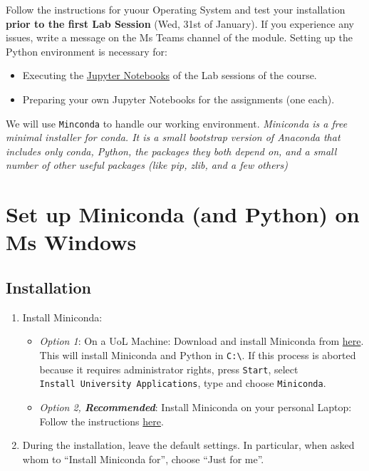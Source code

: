 \documentclass[
  letterpaper,
  DIV=11,
  numbers=noendperiod]{scrreprt}
\providecommand{\tightlist}{%
  \setlength{\itemsep}{0pt}\setlength{\parskip}{0pt}}\usepackage{longtable,booktabs,array}
\begin{document}

Follow the instructions for yuour Operating System and test your
installation \textbf{prior to the first Lab Session} (Wed, 31st of
January). If you experience any issues, write a message on the Ms Teams
channel of the module. Setting up the Python environment is necessary
for:

\begin{itemize}
\tightlist
\item
  Executing the \href{https://docs.jupyter.org/en/latest/}{Jupyter
  Notebooks} of the Lab sessions of the course.
\item
  Preparing your own Jupyter Notebooks for the assignments (one each).
\end{itemize}

We will use \texttt{Minconda} to handle our working environment.
\emph{Miniconda is a free minimal installer for conda. It is a small
bootstrap version of Anaconda that includes only conda, Python, the
packages they both depend on, and a small number of other useful
packages (like pip, zlib, and a few others)}

\section*{Set up Miniconda (and Python) on Ms
Windows}\label{set-up-miniconda-and-python-on-ms-windows}


\subsection*{Installation}\label{installation}

\begin{enumerate}
\def\labelenumi{\arabic{enumi}.}
\tightlist
\item
  Install Miniconda:

  \begin{itemize}
  \tightlist
  \item
    \emph{Option 1}: On a UoL Machine: Download and install Miniconda
    from
    \href{https://repo.anaconda.com/miniconda/Miniconda3-latest-Windows-x86_64.exe}{here}.
    This will install Miniconda and Python in
    \texttt{C:\textbackslash{}}. If this process is aborted because it
    requires administrator rights, press \texttt{Start}, select
    \texttt{Install\ University\ Applications}, type and choose
    \texttt{Miniconda}.
  \item
    \emph{Option 2, \textbf{Recommended}}: Install Miniconda on your
    personal Laptop: Follow the instructions
    \href{https://docs.conda.io/projects/miniconda/en/latest/miniconda-install.html}{here}.
  \end{itemize}
\item
  During the installation, leave the default settings. In particular,
  when asked whom to ``Install Miniconda for'', choose ``Just for me''.
\end{enumerate}
\end{document}
